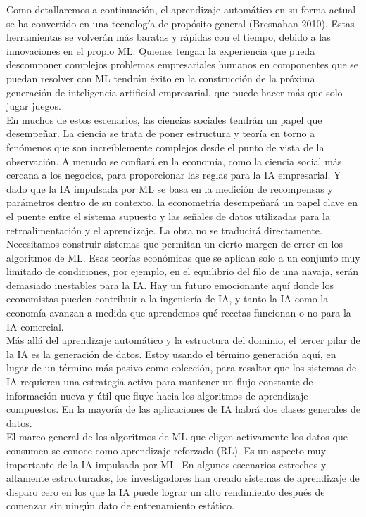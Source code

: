 Como detallaremos a continuación, el aprendizaje automático en su forma actual se ha convertido en una tecnología de propósito general (Bresnahan 2010). Estas herramientas se volverán más baratas y rápidas con el tiempo, debido a las innovaciones en el propio ML. Quienes tengan la experiencia que pueda descomponer complejos problemas empresariales humanos en componentes que se puedan resolver con ML tendrán éxito en la construcción de la próxima generación de inteligencia artificial empresarial, que puede hacer más que solo jugar juegos.\\
En muchos de estos escenarios, las ciencias sociales tendrán un papel que desempeñar. La ciencia se trata de poner estructura y teoría en torno a fenómenos que son increíblemente complejos desde el punto de vista de la observación. A menudo se confiará en la economía, como la ciencia social más cercana a los negocios, para proporcionar las reglas para la IA empresarial. Y dado que la IA impulsada por ML se basa en la medición de recompensas y parámetros dentro de su contexto, la econometría desempeñará un papel clave en el puente entre el sistema supuesto y las señales de datos utilizadas para la retroalimentación y el aprendizaje. La obra no se traducirá directamente. Necesitamos construir sistemas que permitan un cierto margen de error en los algoritmos de ML. Esas teorías económicas que se aplican solo a un conjunto muy limitado de condiciones, por ejemplo, en el equilibrio del filo de una navaja, serán demasiado inestables para la IA. Hay un futuro emocionante aquí donde los economistas pueden contribuir a la ingeniería de IA, y tanto la IA como la economía avanzan a medida que aprendemos qué recetas funcionan o no para la IA comercial.\\
Más allá del aprendizaje automático y la estructura del dominio, el tercer pilar de la IA es la generación de datos. Estoy usando el término generación aquí, en lugar de un término más pasivo como colección, para resaltar que los sistemas de IA requieren una estrategia activa para mantener un flujo constante de información nueva y útil que fluye hacia los algoritmos de aprendizaje compuestos. En la mayoría de las aplicaciones de IA habrá dos clases generales de datos.\\
El marco general de los algoritmos de ML que eligen activamente los datos que consumen se conoce como aprendizaje reforzado (RL). Es un aspecto muy importante de la IA impulsada por ML. En algunos escenarios estrechos y altamente estructurados, los investigadores han creado sistemas de aprendizaje de disparo cero en los que la IA puede lograr un alto rendimiento después de comenzar sin ningún dato de entrenamiento estático.\\

